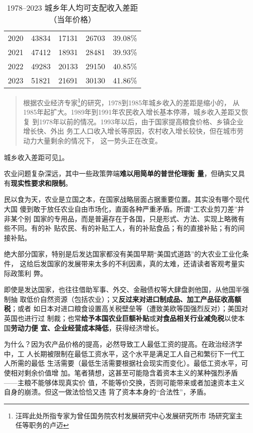 \begin{table}[htbp]
\begin{minipage}{0.47\textwidth}
{\begin{tabular}{ccccc}
2020       & 43834       & 17131       & 26703         & 39.08\%        \\
2021       & 47412       & 18931       & 28481         & 39.93\%        \\
2022       & 49283       & 20133       & 29150         & 40.85\%        \\
2023       & 51821       & 21691       & 30130         & 41.86\%        \\ \bottomrule
\end{tabular}%
}
\end{minipage}

\caption{1978--2023 城乡年人均可支配收入差距（当年价格）}
\label{tab:chengxiangcha}
\end{table}

\begin{quotation}
  根据农业经济专家\footnote{汪晖此处所指专家为曾任国务院农村发展研究中心发展研究所市
    场研究室主任等职务的卢迈}的研究，1978到1985年城乡收入的差距是缩小的，
  从1985年起扩大。1989年到1991年农民收入增长基本停滞，城乡收入差距又恢复
  到1978年以前的情况。1993年以后，由于国家提高粮食价格、乡镇企业增长快、外出
  务工人口收入增长等原因，农村收入增长较快，但在城市劳动力大量剩余的情况下，
  这一势头正在改变。\cite{wangxiandai}
\end{quotation}
城乡收入差距可见\cref{tab:chengxiangcha}。


农业问题复杂深远，其中一些政策弊端\textbf{难以用简单的普世伦理衡
  量}，但确实又具有\textbf{现实性要求和限制}。

民以食为天，农业是立国之本，在国家战略层面占据重要位置。其实没有哪个现代大国
傻到敢于放任农业自由市场化，直面各种严重矛盾。所谓“工农业剪刀差”并非某个别
国家的专用品，而是普遍存在于各国，只是形式、方法、实现上略微有些不同。有的补
贴农民、有的补贴工人，有的补贴食品；有的直接补贴；有的间接补贴。

绝大部分国家，特别是后发达国家都没有美国早期“美国式道路”的大农业工业化条件，
这给后发国家的发展带来太多的不利因素，真的太难，还请读者客观考量实际政策利
弊。

即使是发达国家，也往往借助军事、外交、金融债权等大肆盘剥他国，从他国半强制抽
取低价自然资源（包括农业）；又\textbf{反过来对进口制成品、加工产品征收高额税}；或者
如日本对进口粮食设置高关税壁垒等（遭致美欧等国强烈反对）；美国对英国也进行过
制裁；也常\textbf{给予本国农业巨额补贴}或\textbf{对食品相关行业减免税}以使本国\textbf{劳动力便
  宜、企业经营成本降低}，获得经济增长。

为什么？因为农产品价格的提高，必然导致工人最低工资的提高。在政治经济学中，工
人长期被限制在最低工资水平，这个水平是满足工人自己和繁衍下一代工人所需的最低
生活需要（最低生活需要根据社会现实而变化）。最低工资水平，可使相对剩余价值增
加。笔者猜想，这甚至可能隐含着资本主义的某种强烈矛盾——主粮不能够体现真实价
值，不能等价交换，否则可能带来或者加速资本主义自身的崩溃。但这一做法恰恰又违
背了资本本身的“合法性”，矛盾。

